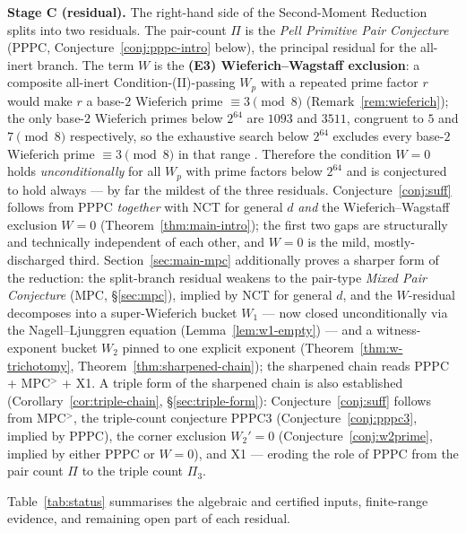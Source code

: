 \documentclass[11pt]{amsart}
\theoremstyle{plain}
\theoremstyle{definition}
\theoremstyle{remark}
\numberwithin{equation}{section}
\begin{document}
\textbf{Stage C (residual).} The right-hand side of the Second-Moment Reduction splits into two residuals. The pair-count $\Pi$ is the \emph{Pell Primitive Pair Conjecture} (PPPC, Conjecture~\ref{conj:pppc-intro} below), the principal residual for the all-inert branch. The term $W$ is the \textbf{(E3) Wieferich--Wagstaff exclusion}: a composite all-inert Condition-(II)-passing $W_p$ with a repeated prime factor $r$ would make $r$ a base-$2$ Wieferich prime $\equiv 3 \pmod 8$ (Remark~\ref{rem:wieferich}); the only base-$2$ Wieferich primes below $2^{64}$ are $1093$ and $3511$, congruent to $5$ and $7 \pmod 8$ respectively, so the exhaustive search below $2^{64}$ excludes every base-$2$ Wieferich prime $\equiv 3 \pmod 8$ in that range \cite{ref:OEISWieferich}. Therefore the condition $W = 0$ holds \emph{unconditionally} for all $W_p$ with prime factors below $2^{64}$ and is conjectured to hold always --- by far the mildest of the three residuals. Conjecture~\ref{conj:suff} follows from PPPC \emph{together} with NCT for general $d$ \emph{and} the Wieferich--Wagstaff exclusion $W = 0$ (Theorem~\ref{thm:main-intro}); the first two gaps are structurally and technically independent of each other, and $W = 0$ is the mild, mostly-discharged third. Section~\ref{sec:main-mpc} additionally proves a sharper form of the reduction: the split-branch residual weakens to the pair-type \emph{Mixed Pair Conjecture} (MPC, \S\ref{sec:mpc}), implied by NCT for general $d$, and the $W$-residual decomposes into a super-Wieferich bucket $W_1$ --- now closed unconditionally via the Nagell--Ljunggren equation (Lemma~\ref{lem:w1-empty}) --- and a witness-exponent bucket $W_2$ pinned to one explicit exponent (Theorem~\ref{thm:w-trichotomy}, Theorem~\ref{thm:sharpened-chain}); the sharpened chain reads PPPC + MPC$^{>}$ + X1. A triple form of the sharpened chain is also established (Corollary~\ref{cor:triple-chain}, \S\ref{sec:triple-form}): Conjecture~\ref{conj:suff} follows from MPC$^{>}$, the triple-count conjecture PPPC3 (Conjecture~\ref{conj:pppc3}, implied by PPPC), the corner exclusion $W_2' = 0$ (Conjecture~\ref{conj:w2prime}, implied by either PPPC or $W = 0$), and X1 --- eroding the role of PPPC from the pair count $\Pi$ to the triple count $\Pi_3$.

Table~\ref{tab:status} summarises the algebraic and certified inputs, finite-range evidence, and remaining open part of each residual.
\end{document}

